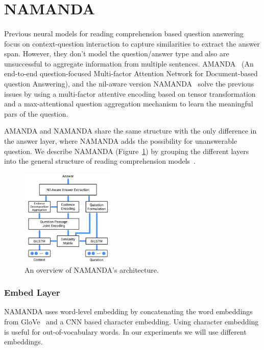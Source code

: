 \section{NAMANDA}
\label{sec:namanda}
\paragraph{}
Previous neural models for reading comprehension based question answering \citep{seo2016bidirectional, yang2017words} focus on context-question interaction to capture similarities to extract the answer span. However, they don't model the question/answer type and also are unsuccessful to aggregate information from multiple sentences. AMANDA~\citep{kundu2018amanda} (An end-to-end question-focused Multi-factor Attention Network for Document-based question Answering), and the nil-aware version NAMANDA~\citep{kundu2018namanda} solve the previous issues by using a multi-factor attentive encoding based on tensor transformation and a max-attentional question aggregation mechanism to learn the meaningful pars of the question. 

AMANDA and NAMANDA share the same structure with the only difference in the answer layer, where NAMANDA adds the possibility for unanswerable question. We describe NAMANDA (Figure~\ref{fig:namanda}) by grouping the different layers into the general structure of reading comprehension models~\citep{qiu2019survey}.  

\begin{figure}[h]
\centering
\includegraphics[width=0.4\textwidth]{images/namanda.pdf}
\caption{An overview of NAMANDA's architecture.}
\label{fig:namanda}
\end{figure}


\subsubsection{Embed Layer}
NAMANDA uses word-level embedding by concatenating the word embeddings from GloVe~\citep{pennington2014glove} and a CNN based character embedding. Using character embedding is useful for out-of-vocabulary words. In our experiments we will use different embeddings.

